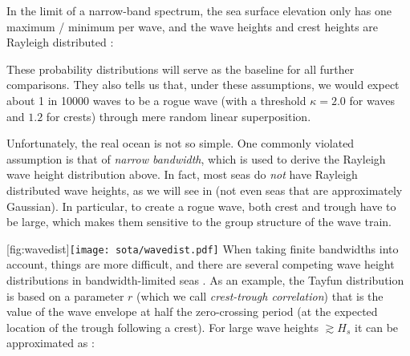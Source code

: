 In the limit of a narrow-band spectrum, the sea surface elevation only has one maximum / minimum per wave, and the wave heights and crest heights are Rayleigh distributed \citep{longuet1952statisticaldistribution,holthuijsen_waves_2010}:


These probability distributions will serve as the baseline for all further comparisons. They also tells us that, under these assumptions, we would expect about \num{1} in \num{10000} waves to be a rogue wave (with a threshold $\kappa=2.0$ for waves and $1.2$ for crests) through mere random linear superposition.

Unfortunately, the real ocean is not so simple. One commonly violated assumption is that of \emph{narrow bandwidth}, which is used to derive the Rayleigh wave height distribution above. In fact, most seas do \emph{not} have Rayleigh distributed wave heights, as we will see in  (not even seas that are approximately Gaussian). In particular, to create a rogue wave, both crest and trough have to be large, which makes them sensitive to the group structure of the wave train.

[fig:wavedist]{\texttt{[image: sota/wavedist.pdf]}}
%
When taking finite bandwidths into account, things are more difficult, and there are several competing wave height distributions in bandwidth-limited seas \citep[\eg the Boccotti, Naess, and Tayfun distributions:][]{naess_distribution_1985,boccotti_mechanics_1989,tayfun_m._aziz_distribution_1990}. As an example, the Tayfun distribution is based on a parameter $r$ (which we call \emph{crest-trough correlation}) that is the value of the wave envelope at half the zero-crossing period (\ie at the expected location of the trough following a crest). For large wave heights $\gtrsim H_s$ it can be approximated as \citep{tayfun_wave-height_2007}:

